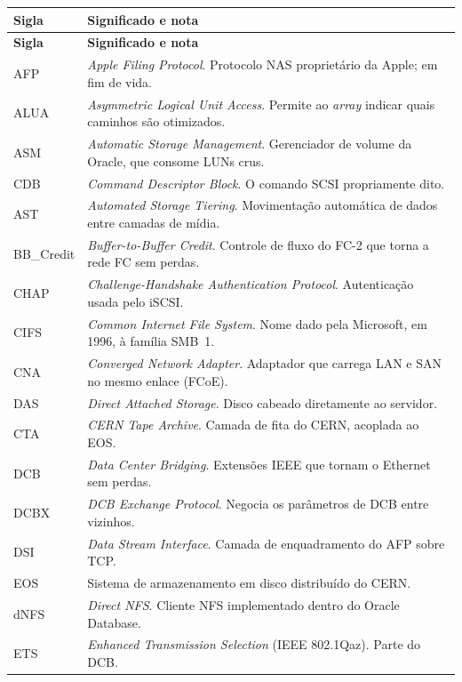 \documentclass[11pt,a4paper]{article}
\begin{document}
{\scriptsize \setlength{\arrayrulewidth}{0.4pt}
\begin{longtable}{@{}p{2.2cm}p{13.4cm}@{}}
\toprule
\textbf{Sigla} & \textbf{Significado e nota} \\
\midrule
\endfirsthead
\toprule
\textbf{Sigla} & \textbf{Significado e nota} \\
\midrule
\endhead
\bottomrule
\endfoot
AFP & \textit{Apple Filing Protocol}. Protocolo NAS proprietário da Apple; em fim de vida. \\
ALUA & \textit{Asymmetric Logical Unit Access}. Permite ao \textit{array} indicar quais caminhos são
otimizados. \\
ASM & \textit{Automatic Storage Management}. Gerenciador de volume da Oracle, que consome LUNs crus. \\
CDB & \textit{Command Descriptor Block}. O comando SCSI propriamente dito. \\
AST & \textit{Automated Storage Tiering}. Movimentação automática de dados entre camadas de mídia. \\
BB\_Credit & \textit{Buffer-to-Buffer Credit}. Controle de fluxo do FC-2 que torna a rede FC sem
perdas. \\
CHAP & \textit{Challenge-Handshake Authentication Protocol}. Autenticação usada pelo iSCSI. \\
CIFS & \textit{Common Internet File System}. Nome dado pela Microsoft, em 1996, à família SMB~1. \\
CNA & \textit{Converged Network Adapter}. Adaptador que carrega LAN e SAN no mesmo enlace (FCoE). \\
DAS & \textit{Direct Attached Storage}. Disco cabeado diretamente ao servidor. \\
CTA & \textit{CERN Tape Archive}. Camada de fita do CERN, acoplada ao EOS. \\
DCB & \textit{Data Center Bridging}. Extensões IEEE que tornam o Ethernet sem perdas. \\
DCBX & \textit{DCB Exchange Protocol}. Negocia os parâmetros de DCB entre vizinhos. \\
DSI & \textit{Data Stream Interface}. Camada de enquadramento do AFP sobre TCP. \\
EOS & Sistema de armazenamento em disco distribuído do CERN. \\
dNFS & \textit{Direct NFS}. Cliente NFS implementado dentro do Oracle Database. \\
ETS & \textit{Enhanced Transmission Selection} (IEEE 802.1Qaz). Parte do DCB. \\

\end{longtable}}
\end{document}
